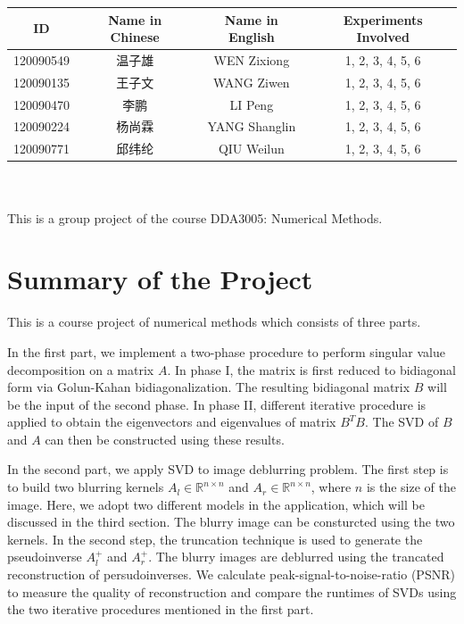 \begin{titlepage}
\vspace*{\fill}
\begin{center}
    \Large
    \begin{tabular}{ |c|c|c|c|} 
    \hline
     ID &Name in Chinese & Name in English & Experiments Involved \\ 
     \hline
     120090549 &温子雄 &WEN Zixiong &  1, 2, 3, 4, 5, 6 \\
     \hline
     120090135 &王子文 & WANG Ziwen & 1, 2, 3, 4, 5, 6 \\ 
     \hline
     120090470 &李鹏 & LI Peng & 1, 2, 3, 4, 5, 6 \\
     \hline
     120090224 &杨尚霖 & YANG Shanglin & 1, 2, 3, 4, 5, 6 \\
     \hline
     120090771 &邱纬纶 & QIU Weilun & 1, 2, 3, 4, 5, 6 \\
     \hline
    \end{tabular}
    \\[1.0 cm]
    \\
    This is a group project of the course DDA3005: Numerical Methods. 
    
\end{center}
\vspace*{\fill}

\end{titlepage}

\tableofcontents
\pagebreak

\rmfamily
\section{Summary of the Project}
This is a course project of numerical methods which consists of three parts.

In the first part, we implement a two-phase procedure to perform singular value decomposition on a matrix $A$. In phase I, the matrix is first reduced to bidiagonal form via Golun-Kahan bidiagonalization. The resulting bidiagonal matrix $B$ will be the input of the second phase. In phase II, different iterative procedure is applied to obtain the eigenvectors and eigenvalues of matrix $B^TB$. The SVD of $B$ and $A$ can then be constructed using these results.

In the second part, we apply SVD to image deblurring problem. The first step is to build two blurring kernels $A_l \in \mathbb{R}^{n \times n}$ and $A_r \in \mathbb{R}^{n \times n}$, where $n$ is the size of the image. Here, we adopt two different models in the application, which will be discussed in the third section. The blurry image can be consturcted using the two kernels. In the second step, the truncation technique is used to generate the pseudoinverse $A_l^+$ and $A_r^+$. The blurry images are deblurred using the trancated reconstruction of persudoinverses. We calculate peak-signal-to-noise-ratio (PSNR) to measure the quality of reconstruction and compare the runtimes of SVDs using the two iterative procedures mentioned in the first part. 


